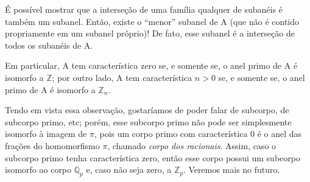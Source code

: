 \documentclass[../algebraIII_notes.tex]{subfiles}
\begin{document}
\begin{tcolorbox}[
		skin=enhanced,
		title=Observação,
		fonttitle=\bfseries,
		colframe=black,
		colbacktitle=cyan!75!white,
		colback=cyan!15,
		colbacklower=black,
		coltitle=black,
		drop fuzzy shadow,
	]
	É possível mostrar que a interseção de uma família qualquer de subanéis é também um subanel. Então, existe o ``menor'' subanel de A (que não é contido propriamente em um subanel próprio)! De fato, esse subanel é a interseção de todos os subanéis de A.

	Em particular, A tem característica zero se, e somente se, o anel primo de A é isomorfo a \(\mathbb{Z}\); por outro lado, A tem característica \(n>0\) se, e somente se, o anel primo de A é isomorfo a \(\mathbb{Z}_{n}\).
\end{tcolorbox}
Tendo em vista essa observação, gostaríamos de poder falar de subcorpo, de subcorpo primo, etc; porém, esse subcorpo primo não pode ser simplesmente isomorfo à imagem de \(\pi \), pois um corpo primo com característica 0 é o anel das frações do homomorfismo \(\pi \), chamado \textit{corpo dos racionais}. Assim, caso o subcorpo primo tenha característica zero, então esse corpo possui um subcorpo isomorfo ao corpo \(\mathbb{Q}_{p}\) e, caso não seja zero, a \(\mathbb{Z}_{p}\). Veremos mais no futuro.
\end{document}
